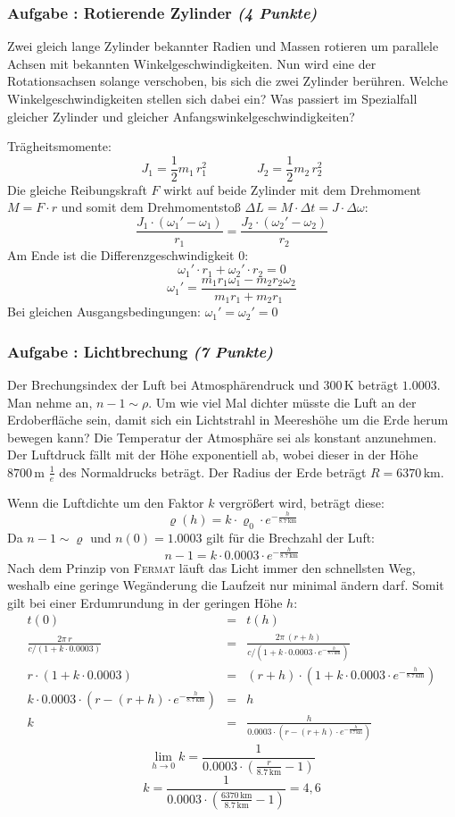 \documentclass[12pt,a4paper]{article}
\newcommand{\unit}[1]{\,\mathrm{#1}}
\newcounter{numlabel}
\newenvironment{problem}[2]{\stepcounter{numlabel} \vspace{1ex} \subsubsection*{Aufgabe \the\value{numlabel}: #1 \emph{(#2 Punkte)}} \renewcommand{\Currentlabel}{Aufgabe \the\value{numlabel}: #1}}{

}
\begin{document}
\begin{problem}{Rotierende Zylinder}{4}
Zwei gleich lange Zylinder bekannter Radien und Massen rotieren um parallele Achsen mit bekannten Winkelgeschwindigkeiten. Nun wird eine der Rotationsachsen solange verschoben, bis sich die zwei Zylinder berühren. Welche Winkelgeschwindigkeiten stellen sich dabei ein? Was passiert im Spezialfall gleicher Zylinder und gleicher Anfangswinkelgeschwindigkeiten?
\begin{solution}
Trägheitsmomente:
\[
 J_1 = \frac 1 2 m_1\,r_1^2 \qquad\qquad J_2 = \frac 1 2 m_2\,r_2^2
\]
Die gleiche Reibungskraft $F$ wirkt auf beide Zylinder mit dem Drehmoment $M = F\cdot r$ und somit dem Drehmomentstoß $\Delta L = M\cdot\Delta t = J\cdot\Delta\omega$:
\[
 \frac{J_1\cdot(\omega_1'-\omega_1)}{r_1} = \frac{J_2\cdot(\omega_2'-\omega_2)}{r_2}
\]
Am Ende ist die Differenzgeschwindigkeit 0:
\[
 \omega_1'\cdot r_1 + \omega_2'\cdot r_2 = 0
\]
\[
 \omega_1' = \frac{m_1r_1\omega_1-m_2r_2\omega_2}{m_1r_1+m_2r_1}
\]
Bei gleichen Ausgangsbedingungen: $\omega_1' = \omega_2' = 0$
\end{solution}
\end{problem}

\begin{problem}{Lichtbrechung}{7}
Der Brechungsindex der Luft bei Atmosphärendruck und $300\unit{K}$ beträgt $1.0003$. Man nehme an, $n-1 \sim \rho$. Um wie viel Mal dichter müsste die Luft an der Erdoberfläche sein, damit sich ein Lichtstrahl in Meereshöhe um die Erde herum bewegen kann? Die Temperatur der Atmosphäre sei als konstant anzunehmen. Der Luftdruck fällt mit der Höhe exponentiell ab, wobei dieser in der Höhe $8700\unit{m}$ $\frac 1e$ des Normaldrucks beträgt. Der Radius der Erde beträgt $R=6370\unit{km}$.
\begin{solution}
Wenn die Luftdichte um den Faktor $k$ vergrößert wird, beträgt diese:
\[
 \varrho(h) = k\cdot\varrho_0 \cdot e^{-\frac{h}{8.7\unit{km}}}
\]
Da $n-1\sim \varrho$ und $n(0) = 1.0003$ gilt für die Brechzahl der Luft:
\[
 n-1 = k\cdot 0.0003\cdot e^{-\frac{h}{8.7\unit{km}}}
\]
Nach dem Prinzip von \textsc{Fermat} läuft das Licht immer den schnellsten Weg, weshalb eine geringe Wegänderung die Laufzeit nur minimal ändern darf. Somit gilt bei einer Erdumrundung in der geringen Höhe $h$:
\begin{eqnarray*}
 t(0) &=& t(h) \\
 \frac{2\pi\,r}{c/(1+k\cdot0.0003)} &=& \frac{2\pi\,(r+h)}{c/(1+k\cdot0.0003\cdot e^{-\frac{h}{8.7\unit{km}}})} \\
 r\cdot(1+k\cdot0.0003) &=& (r+h)\cdot(1+k\cdot0.0003\cdot e^{-\frac{h}{8.7\unit{km}}})\\
 k\cdot0.0003\cdot\left(r-(r+h)\cdot e^{-\frac{h}{8.7\unit{km}}}\right) &=& h \\
 k &=& \frac{h}{0.0003\cdot\left(r-(r+h)\cdot e^{-\frac{h}{8.7\unit{km}}}\right)}
\end{eqnarray*}
\[
 \lim_{h\rightarrow0} k = \frac{1}{0.0003\cdot\left(\frac{r}{8.7\unit{km}}-1\right)}
\]
\[
 k = \frac{1}{0.0003\cdot\left(\frac{6370\unit{km}}{8.7\unit{km}}-1\right)} = 4,6
\]
\end{solution}
\end{problem}
\end{document}

